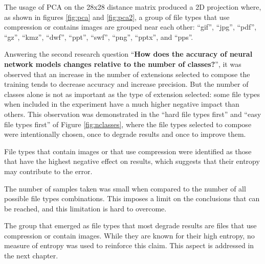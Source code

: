 
The usage of PCA on the 28x28 distance matrix produced a 2D projection where, as shown in figures \ref{fig:pca} and \ref{fig:pca2}, a group of file types that use compression or contains images are grouped near each other: 
``gif'',
``jpg'',
``pdf'',
``gz'',
``kmz'',
``dwf'',
``ppt'',
``swf'',
``png'',
``pptx'',
and ``pps''.


Answering the second research question ``\textbf{How does the accuracy of neural network models changes relative to the number of classes?}'', 
it was observed that an increase in the number of extensions selected to compose the training tends to decrease accuracy and increase precision. But the number of classes alone is not as important as the type of extension selected: some file types when included in the experiment have a much higher negative impact than others. This observation was demonstrated in the ``hard file types first'' and ``easy file types first'' of Figure \ref{fig:nclasses}, where the file types selected to compose were intentionally chosen, once to degrade results and once to improve them.

File types that contain images or that use compression were identified as those that have the highest negative effect on results, which suggests that their entropy may contribute to the error.

The number of samples taken was small when compared to the number of all possible file types combinations. This imposes a limit on the conclusions that can be reached, and this limitation is hard to overcome.

The group that emerged as file types that most degrade results are files that use compression or contain images. While they are known for their high entropy, no measure of entropy was used to reinforce this claim.
This aspect is addressed in the next chapter.
